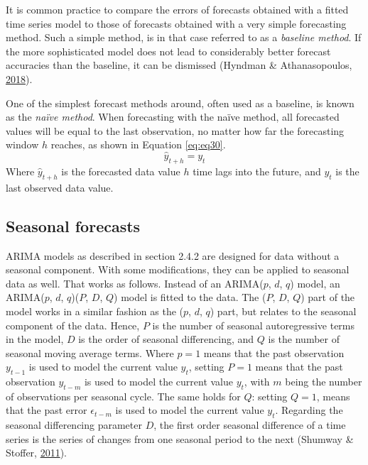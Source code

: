\documentclass[12pt,oneside]{reedthesis}
\begin{document}
It is common practice to compare the errors of forecasts obtained with a
fitted time series model to those of forecasts obtained with a very
simple forecasting method. Such a simple method, is in that case
referred to as a \emph{baseline method}. If the more sophisticated model
does not lead to considerably better forecast accuracies than the
baseline, it can be dismissed (Hyndman \& Athanasopoulos,
\protect\hyperlink{ref-hyndman2018fpp}{2018}).

One of the simplest forecast methods around, often used as a baseline,
is known as the \emph{naïve method}. When forecasting with the naïve
method, all forecasted values will be equal to the last observation, no
matter how far the forecasting window \(h\) reaches, as shown in
Equation \eqref{eq:eq30}.
\begin{equation}
\hat{y}_{t+h} = y_{t}
\label{eq:eq30}
\end{equation}
Where \(\hat{y}_{t+h}\) is the forecasted data value \(h\) time lags
into the future, and \(y_{t}\) is the last observed data value.

\subsection{Seasonal forecasts}\label{twofourfour}

ARIMA models as described in section 2.4.2 are designed for data without
a seasonal component. With some modifications, they can be applied to
seasonal data as well. That works as follows. Instead of an ARIMA(\(p\),
\(d\), \(q\)) model, an ARIMA(\(p\), \(d\), \(q\))(\(P\), \(D\), \(Q\))
model is fitted to the data. The (\(P\), \(D\), \(Q\)) part of the model
works in a similar fashion as the (\(p\), \(d\), \(q\)) part, but
relates to the seasonal component of the data. Hence, \(P\) is the
number of seasonal autoregressive terms in the model, \(D\) is the order
of seasonal differencing, and \(Q\) is the number of seasonal moving
average terms. Where \(p = 1\) means that the past observation
\(y_{t-1}\) is used to model the current value \(y_{t}\), setting
\(P = 1\) means that the past observation \(y_{t-m}\) is used to model
the current value \(y_{t}\), with \(m\) being the number of observations
per seasonal cycle. The same holds for \(Q\): setting \(Q = 1\), means
that the past error \(\epsilon_{t-m}\) is used to model the current
value \(y_{t}\). Regarding the seasonal differencing parameter \(D\),
the first order seasonal difference of a time series is the series of
changes from one seasonal period to the next (Shumway \& Stoffer,
\protect\hyperlink{ref-shumway2011}{2011}).
\end{document}
